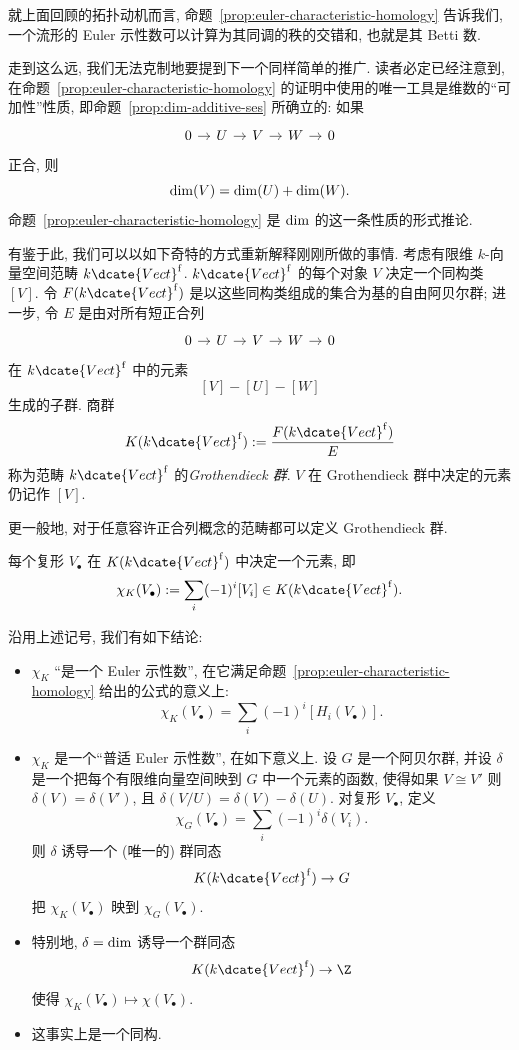 就上面回顾的拓扑动机而言, 命题~\ref{prop:euler-characteristic-homology} 告诉我们, 一个流形的 Euler 示性数可以计算为其同调的秩的交错和, 也就是其 Betti 数.

走到这么远, 我们无法克制地要提到下一个同样简单的推广. 读者必定已经注意到, 在命题~\ref{prop:euler-characteristic-homology} 的证明中使用的唯一工具是维数的``可加性''性质, 即命题~\ref{prop:dim-additive-ses} 所确立的: 如果
\[
\begin{tikzcd}[column sep=.9em]
0 \ar[r] & U \ar[r] & V \ar[r] & W \ar[r] & 0
\end{tikzcd}
\]
正合, 则
\[
\operatorname{dim}(V)=\operatorname{dim}(U)+\operatorname{dim}(W).
\]
命题~\ref{prop:euler-characteristic-homology} 是 $\operatorname{dim}$ 的这一条性质的形式推论.

有鉴于此, 我们可以以如下奇特的方式重新解释刚刚所做的事情. 考虑有限维 $k$-向量空间范畴 $k\dcate{Vect}^{\mathrm f}$. $k\dcate{Vect}^{\mathrm f}$ 的每个对象 $V$ 决定一个同构类 $[V]$. 令 $F(k\dcate{Vect}^{\mathrm f})$ 是以这些同构类组成的集合为基的自由阿贝尔群; 进一步, 令 $E$ 是由对所有短正合列
\[
\begin{tikzcd}[column sep=.9em]
0 \ar[r] & U \ar[r] & V \ar[r] & W \ar[r] & 0
\end{tikzcd}
\]
在 $k\dcate{Vect}^{\mathrm f}$ 中的元素
\[
[V]-[U]-[W]
\]
生成的子群. 商群
\[
K(k\dcate{Vect}^{\mathrm f}):=\frac{F(k\dcate{Vect}^{\mathrm f})}{E}
\]
称为范畴 $k\dcate{Vect}^{\mathrm f}$ 的\emph{Grothendieck 群}. $V$ 在 Grothendieck 群中决定的元素仍记作 $[V]$.

更一般地, 对于任意容许正合列概念的范畴都可以定义 Grothendieck 群.

每个复形 $V_\bullet$ 在 $K(k\dcate{Vect}^{\mathrm f})$ 中决定一个元素, 即
\[
\chi_K(V_\bullet):=\sum_i(-1)^i[V_i]\in K(k\dcate{Vect}^{\mathrm f}).
\]

\begin{claim}\label{claim:grothendieck-universal}
沿用上述记号, 我们有如下结论:
\begin{itemize}
\item $\chi_K$ ``是一个 Euler 示性数'', 在它满足命题~\ref{prop:euler-characteristic-homology} 给出的公式的意义上:
\[
\chi_K(V_\bullet)=\sum_i(-1)^i[H_i(V_\bullet)].
\]
\item $\chi_K$ 是一个``普适 Euler 示性数'', 在如下意义上. 设 $G$ 是一个阿贝尔群, 并设 $\delta$ 是一个把每个有限维向量空间映到 $G$ 中一个元素的函数, 使得如果 $V\cong V'$ 则 $\delta(V)=\delta(V')$, 且 $\delta(V/U)=\delta(V)-\delta(U)$. 对复形 $V_\bullet$, 定义
\[
\chi_G(V_\bullet)=\sum_i(-1)^i\delta(V_i).
\]
则 $\delta$ 诱导一个 (唯一的) 群同态
\[
K(k\dcate{Vect}^{\mathrm f})\to G
\]
把 $\chi_K(V_\bullet)$ 映到 $\chi_G(V_\bullet)$.
\item 特别地, $\delta=\operatorname{dim}$ 诱导一个群同态
\[
K(k\dcate{Vect}^{\mathrm f})\to\Z
\]
使得 $\chi_K(V_\bullet)\mapsto\chi(V_\bullet)$.
\item 这事实上是一个同构.
\end{itemize}
\end{claim}


